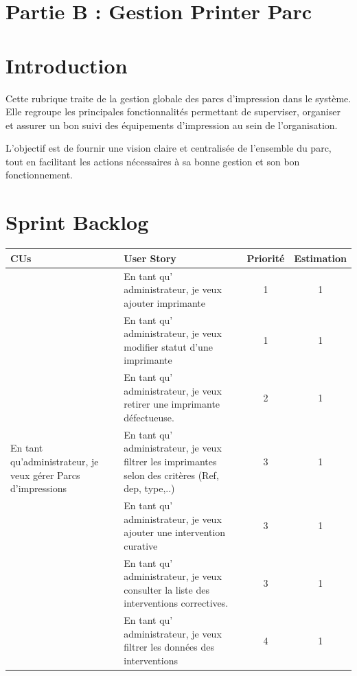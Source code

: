 \documentclass[a4paper,11pt]{report}
\begin{document}


\section*{Partie B : Gestion Printer Parc}
\setcounter{section}{0}
\section{Introduction}

Cette rubrique traite de la gestion globale des parcs d’impression dans le système. Elle regroupe les principales fonctionnalités permettant de superviser, organiser et assurer un bon suivi des équipements d’impression au sein de l'organisation.

L’objectif est de fournir une vision claire et centralisée de l’ensemble du parc, tout en facilitant les actions nécessaires à sa bonne gestion et son bon fonctionnement.




\section{Sprint Backlog}

\begin{tabular}{|m{4cm}|m{5cm}|c|c|}
\hline
\textbf{	CUs} & \textbf{User Story} & \textbf{Priorité} & \textbf{Estimation} \\
\hline

\multirow{7}{4cm}{En tant qu’administrateur, je veux gérer Parcs d’impressions} 
& En tant qu' administrateur, je veux ajouter imprimante & 1 & 1 \\
\cline{2-4}
& En tant qu' administrateur, je veux modifier statut d’une imprimante & 1 & 1 \\
\cline{2-4}
& En tant qu' administrateur, je veux retirer une imprimante défectueuse. & 2 & 1 \\
\cline{2-4}
& En tant qu' administrateur, je veux filtrer les imprimantes selon des critères (Ref, dep, type,..) & 3 & 1 \\
\cline{2-4}
& En tant qu' administrateur, je veux ajouter une intervention curative & 3 & 1 \\
\cline{2-4}
& En tant qu' administrateur, je veux consulter la liste des interventions correctives. & 3 & 1 \\
\cline{2-4}
& En tant qu' administrateur, je veux filtrer les données des interventions & 4 & 1 \\
\hline
\end{tabular}
\end{document}

